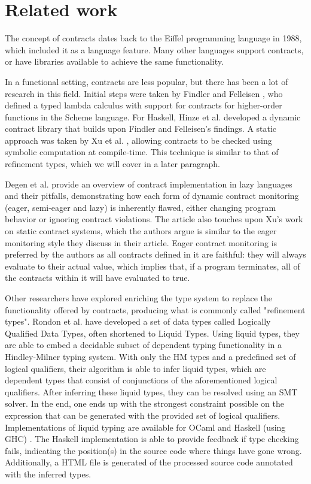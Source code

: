 \documentclass[10pt]{report}
\begin{document}
\section{Related work}
The concept of contracts dates back to the Eiffel programming language \cite{Meyer:1988wp} in 1988, which included it as a language feature.
Many other languages support contracts, or have libraries available to achieve the same functionality.

In a functional setting, contracts are less popular, but there has been a lot of research in this field.
Initial steps were taken by Findler and Felleisen \cite{Findler:2002:CHF:583852.581484}, who defined a typed lambda calculus with support for contracts for higher-order functions in the Scheme language.
For Haskell, Hinze et al. \cite{Hinze06typedcontracts} developed a dynamic contract library that builds upon Findler and Felleisen's findings. 
A static approach was taken by Xu et al. \cite{Xu:2006ul, Xu:2009:SCC:1594834.1480889}, allowing contracts to be checked using symbolic computation at compile-time. This technique is similar to that of refinement types, which we will cover in a later paragraph.

Degen et al. \cite{DegenThiemannWehr2009} provide an overview of contract implementation in lazy languages and their pitfalls, demonstrating how each form of dynamic contract monitoring (eager, semi-eager and lazy) is inherently flawed, either changing program behavior or ignoring contract violations.
The article also touches upon Xu's work on static contract systems, which the authors argue is similar to the eager monitoring style they discuss in their article.
Eager contract monitoring is preferred by the authors as all contracts defined in it are faithful: they will always evaluate to their actual value, which implies that, if a program terminates, all of the contracts within it will have evaluated to true.

Other researchers have explored enriching the type system to replace the functionality offered by contracts, producing what is commonly called "refinement types".
Rondon et al. \cite{rondon2008liquid} have developed a set of data types called Logically Qualified Data Types, often shortened to Liquid Types.
Using liquid types, they are able to embed a decidable subset of dependent typing functionality in a Hindley-Milner typing system.
With only the HM types and a predefined set of logical qualifiers, their algorithm is able to infer liquid types, which are dependent types that consist of conjunctions of the aforementioned logical qualifiers.
After inferring these liquid types, they can be resolved using an SMT solver.
In the end, one ends up with the strongest constraint possible on the expression that can be generated with the provided set of logical qualifiers.
Implementations of liquid typing are available for OCaml \cite{rondon2008liquid} and Haskell (using GHC) \cite{rondon2013refinement}.
The Haskell implementation is able to provide feedback if type checking fails, indicating the position(s) in the source code where things have gone wrong.
Additionally, a HTML file is generated of the processed source code annotated with the inferred types.
\end{document}
